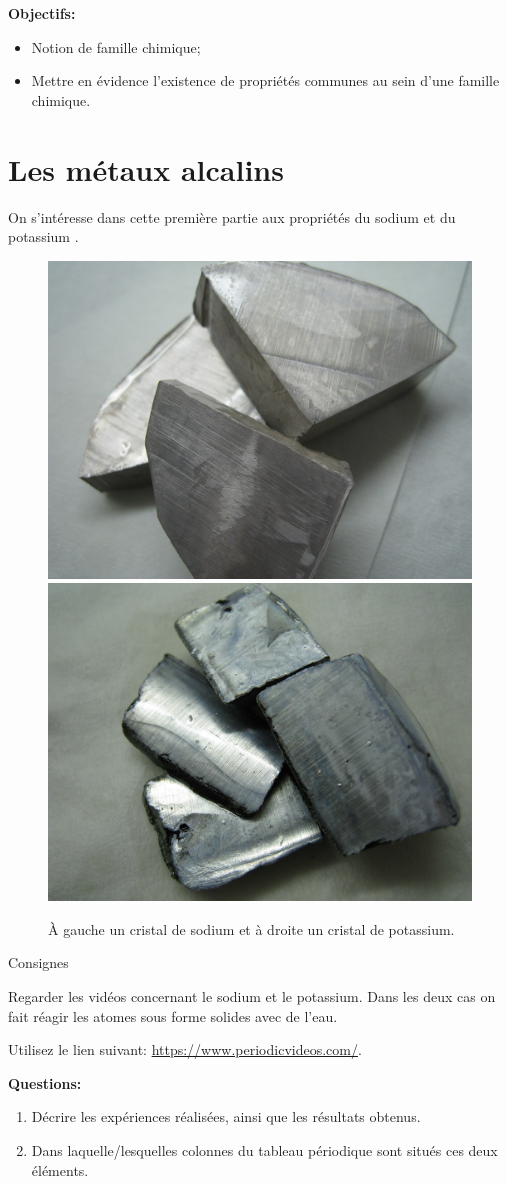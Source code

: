 \documentclass[french]{article}
\begin{document}
\noindent\textbf{Objectifs:}
\begin{itemize}
	\item Notion de famille chimique;
	\item Mettre en évidence l'existence de propriétés communes au sein d'une famille chimique.
\end{itemize}

\section{Les métaux alcalins}

On s'intéresse dans cette première partie aux propriétés du sodium  et du potassium .

\begin{figure}[ht]
	\centering
	\includegraphics[width=.25\textwidth]{Sodium.jpg}\hspace{3cm}
	\includegraphics[width=.25  \textwidth]{Potassium.jpg}
	\caption{À gauche un cristal de sodium et à droite un cristal de potassium.}
\end{figure}
\begin{Protocol}{Consignes}


	Regarder les vidéos concernant le sodium et le potassium. Dans les deux cas on fait réagir les atomes sous forme solides avec de l'eau.\medskip

	\centering
	Utilisez le lien suivant: \url{https://www.periodicvideos.com/}.

\end{Protocol}

\noindent\textbf{Questions:}
\begin{enumerate}
	\item Décrire les expériences réalisées, ainsi que les résultats obtenus.
	
	
	
	\item Dans laquelle/lesquelles colonnes du tableau périodique sont situés ces deux éléments.
	
\end{enumerate}
\end{document}
